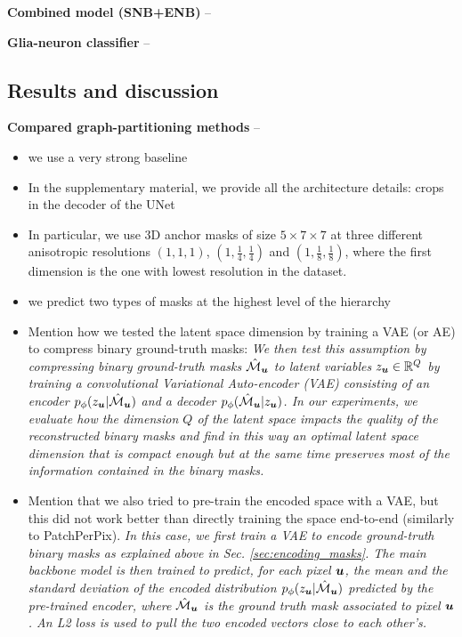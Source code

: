 \textbf{Combined model (SNB+ENB)} -- 

\textbf{Glia-neuron classifier} -- 

\subsection{Results and discussion}

\textbf{Compared graph-partitioning methods} --

\begin{itemize}
\item we use a very strong baseline
\item In the supplementary material, we provide all the architecture details: crops in the decoder of the UNet
\item In particular, we use 3D anchor masks of size $5\times 7 \times 7$ at three different anisotropic resolutions $(1,1,1)$, $(1,\frac{1}{4},\frac{1}{4})$ and $(1,\frac{1}{8},\frac{1}{8})$, where the first dimension is the one with lowest resolution in the dataset.
\item we predict two types of \maskname masks at the highest level of the hierarchy
\item Mention how we tested the latent space dimension by training a VAE (or AE) to compress binary ground-truth \maskname masks: \emph{We then test this assumption by compressing binary ground-truth \maskname masks $\hat{\mathcal{M}}_{\bm{u}}$ to latent variables $z_{\bm{u}}\in \mathbb{R}^Q$ by training a convolutional Variational Auto-encoder (VAE) \cite{kingma2013auto,rezende2014stochastic} consisting of an encoder $p_{\phi}(z_{\bm{u}}|\hat{\mathcal{M}}_{\bm{u}})$ and a decoder $p_{\phi}(\hat{\mathcal{M}}_{\bm{u}}|z_{\bm{u}})$.
In our experiments, we evaluate how the dimension $Q$ of the latent space impacts the quality of the reconstructed binary masks and find in this way an optimal latent space dimension that is compact enough but at the same time preserves most of the information contained in the binary masks.}
\item Mention that we also tried to pre-train the encoded space with a VAE, but this did not work better than directly training the space end-to-end (similarly to PatchPerPix). 
\emph{In this case, we first train a VAE to encode ground-truth binary masks as explained above in Sec. \ref{sec:encoding_masks}. 
The main backbone model is then trained to predict, for each pixel $\bm{u}$, the mean and the standard deviation of the encoded distribution $p_{\phi}(z_{\bm{u}}|\hat{\mathcal{M}}_{\bm{u}})$ predicted by the pre-trained encoder, where $\hat{\mathcal{M}}_{\bm{u}}$ is the ground truth \maskname mask associated to pixel $\bm{u}$. An L2 loss is used to pull the two encoded vectors close to each other's. 
}
\end{itemize}

